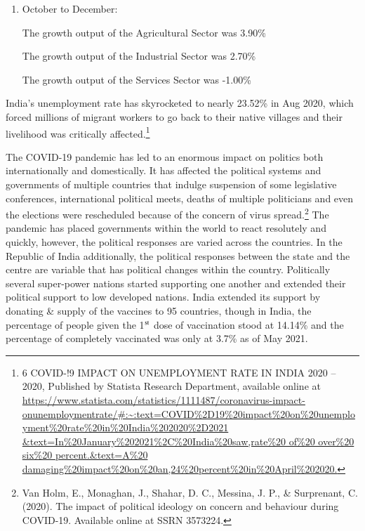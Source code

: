 \begin{multicols}{2}
\begin{enumerate}[label=$\blacktriangleright$]
\item October to December:

The growth output of the Agricultural Sector was 3.90\%

The growth output of the Industrial Sector was 2.70\%

The growth output of the Services Sector was -1.00\%
\end{enumerate}

\noi
India’s unemployment rate has skyrocketed to nearly 23.52\% in Aug 2020, which
forced millions of migrant workers to go back to their native villages and their
livelihood was critically affected.\footnote{6 COVID-!9 IMPACT ON UNEMPLOYMENT RATE IN INDIA 2020 – 2020, Published by Statista Research Department, available online at  \url{https://www.statista.com/statistics/1111487/coronavirus-impact-onunemploymentrate/#:~:text=COVID\%2D19\%20impact\%20on\%20unemployment\%20rate\%20in\%20India\%202020\%2D2021
\&text=In\%20January\%202021\%2C\%20India\%20saw,rate\%20 of\%20 over\%20 six\%20 percent.\&text=A\%20 damaging\%20impact\%20on\%20an,24\%20percent\%20in\%20April\%202020.}}


\noi
The COVID-19 pandemic has led to an enormous impact on politics both internationally and
domestically. It has affected the political systems and governments of multiple countries that
indulge suspension of some legislative conferences, international political meets, deaths of
multiple politicians and even the elections were rescheduled because of the concern of virus
spread.\footnote{Van Holm, E., Monaghan, J., Shahar, D. C., Messina, J. P., \& Surprenant, C. (2020). The impact of political ideology on concern and behaviour during COVID-19. Available online at SSRN 3573224.} The pandemic has placed governments within the world to react resolutely and
quickly, however, the political responses are varied across the countries. In the Republic of
India additionally, the political responses between the state and the centre are variable that
has political changes within the country. Politically several super-power nations started
supporting one another and extended their political support to low developed nations. India
extended its support by donating \& supply of the vaccines to 95 countries, though in India,
the percentage of people given the 1$^{\rm st}$ dose of vaccination stood at 14.14\% and the percentage
of completely vaccinated was only at 3.7\% as of May 2021. 



\end{multicols}
